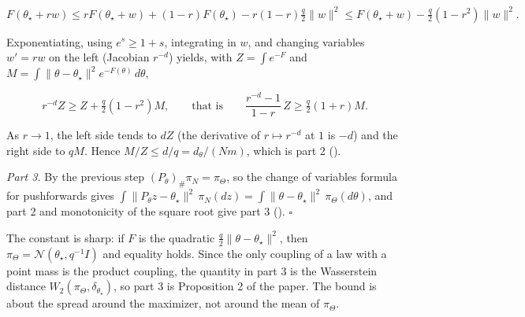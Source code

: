\documentclass[11pt,a4paper]{article}
\begin{document}
\[F(\theta_\star+rw)\le rF(\theta_\star+w)+(1-r)F(\theta_\star)-r(1-r)\tfrac q2\|w\|^2\le F(\theta_\star+w)-\tfrac q2(1-r^2)\|w\|^2.\]


Exponentiating, using \(e^s\ge1+s\), integrating in \(w\), and changing variables \(w'=rw\) on the left (Jacobian \(r^{-d}\)) yields, with \(Z=\int e^{-F}\) and \(M=\int\|\theta-\theta_\star\|^2e^{-F(\theta)}\,d\theta\),


\[r^{-d}Z\ge Z+\tfrac q2(1-r^2)M,\qquad\text{that is}\qquad\frac{r^{-d}-1}{1-r}\,Z\ge\tfrac q2(1+r)M.\]


As \(r\to1\), the left side tends to \(dZ\) (the derivative of \(r\mapsto r^{-d}\) at \(1\) is \(-d\)) and the right side to \(qM\). Hence \(M/Z\le d/q=d_\theta/(Nm)\), which is part 2 (\cite[Section~3.6.1]{LangevinLean2026Proximal}).




\emph{Part 3.} By the previous step \((P_\theta)_\#\pi_N=\pi_\Theta\), so the change of variables formula for pushforwards gives \(\int\|P_\theta z-\theta_\star\|^2\,\pi_N(dz)=\int\|\theta-\theta_\star\|^2\,\pi_\Theta(d\theta)\), and part 2 and monotonicity of the square root give part 3 (\cite[Section~3.6.1]{LangevinLean2026Proximal}). \(\square\)




The constant is sharp: if \(F\) is the quadratic \(\frac q2\|\theta-\theta_\star\|^2\), then \(\pi_\Theta=\mathcal N(\theta_\star,q^{-1}I)\) and equality holds. Since the only coupling of a law with a point mass is the product coupling, the quantity in part 3 is the Wasserstein distance \(W_2(\pi_\Theta,\delta_{\theta_\star})\), so part 3 is Proposition 2 of the paper. The bound is about the spread around the maximizer, not around the mean of \(\pi_\Theta\).
\end{document}
